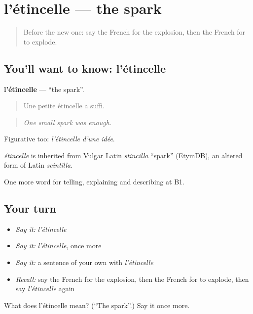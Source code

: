 \section[l'étincelle]{l'étincelle — the spark}

\label{lesson:FR-C302-etincelle}



\begin{quote}
Before the new one: say the French for the explosion, then the French for to explode.
\end{quote}

\subsection*{You'll want to know: l'étincelle}
\textbf{l'étincelle} — \textquotedblleft{}the spark\textquotedblright{}.

\begin{quote}
Une petite étincelle a suffi.
\end{quote}

\begin{quote}
\emph{One small spark was enough.}
\end{quote}

Figurative too: \emph{l'étincelle d'une idée}.

\begin{cousinweb}
\emph{étincelle} is inherited from Vulgar Latin \emph{stincilla} \textquotedblleft{}spark\textquotedblright{} (EtymDB), an altered form of Latin \emph{scintilla}.
\end{cousinweb}

\begin{grammarlens}[title={What you've built}]
One more word for telling, explaining and describing at B1.
\end{grammarlens}

\subsection*{Your turn}
\begin{itemize}
\raggedright
  \item \emph{Say it:} \emph{l'étincelle}
  \item \emph{Say it:} \emph{l'étincelle}, once more
  \item \emph{Say it:} a sentence of your own with \emph{l'étincelle}
  \item \emph{Recall:} say the French for the explosion, then the French for to explode, then say \emph{l'étincelle} again
\end{itemize}

\begin{tcolorbox}[breakable,colback=teal!4,colframe=teal!35!black,title={Before you move on}]
What does l'étincelle mean? (\textquotedblleft{}The spark\textquotedblright{}.) Say it once more.
\end{tcolorbox}

